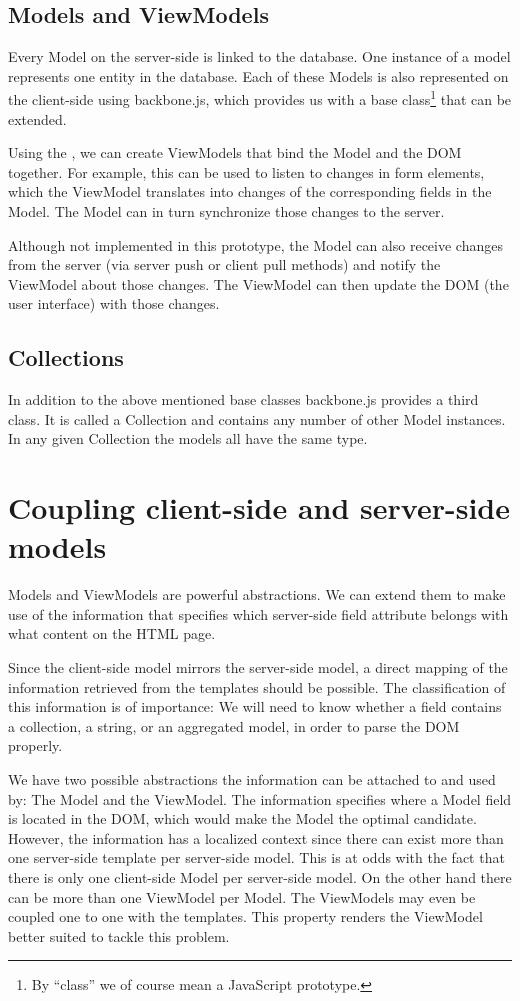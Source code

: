 \documentclass[thesis.tex]{subfiles}
\begin{document}
\subsection{Models and ViewModels}
Every Model on the server-side is linked to the database.
One instance of a model represents one entity in the database.
Each of these Models is also represented on the client-side using backbone.js,
which provides us with a  base class\footnote{By
``class'' we of course mean a JavaScript prototype.} that can be extended.

Using the , we can create ViewModels that bind the Model
and the DOM together.
For example, this can be used to listen to changes in form elements,
which the ViewModel translates into changes of the corresponding
fields in the Model. The Model can in turn synchronize those changes to the
server.

Although not implemented in this prototype, the Model can also receive changes
from the server (via server push or client pull methods) and notify
the ViewModel about those changes. The ViewModel can then update the
DOM (the user interface) with those changes.

\subsection{Collections}
In addition to the above mentioned base classes backbone.js provides a third
class.
It is called a Collection and contains any number of other Model instances.
In any given Collection the models all have the same type.

\section{Coupling client-side and server-side models}
Models and ViewModels are powerful abstractions.
We can extend them to make use of the information that specifies
which server-side field attribute belongs with what content on the HTML page.

Since the client-side model mirrors the server-side model, a direct mapping of
the information retrieved from the templates should be possible.
The classification of this information is of importance: We will need to know
whether a field contains a collection, a string, or an aggregated model,
in order to parse the DOM properly.

We have two possible abstractions the information can be attached to and
used by: The Model and the ViewModel.
The information specifies where a Model field is located in the DOM, which would
make the Model the optimal candidate. However, the information has a
localized context since there can exist more than one server-side template per
server-side model.
This is at odds with the fact that there is only one client-side Model
per server-side model.
On the other hand there can be more than one ViewModel per Model.
The ViewModels may even be coupled one to one with the templates.
This property renders the ViewModel better suited to tackle this problem.
\end{document}
